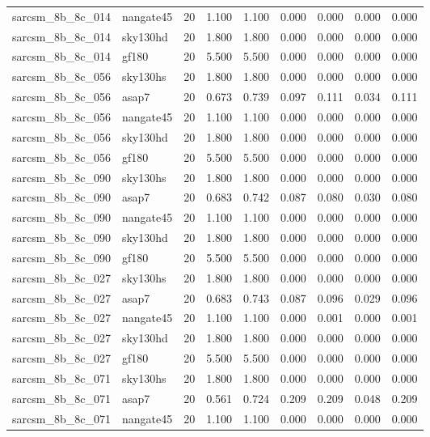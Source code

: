 \begin{tabular}{llrrrrrrr}
sarcsm\_8b\_8c\_014 & nangate45 & 20 & 1.100 & 1.100 & 0.000 & 0.000 & 0.000 & 0.000 \\
sarcsm\_8b\_8c\_014 & sky130hd & 20 & 1.800 & 1.800 & 0.000 & 0.000 & 0.000 & 0.000 \\
sarcsm\_8b\_8c\_014 & gf180 & 20 & 5.500 & 5.500 & 0.000 & 0.000 & 0.000 & 0.000 \\
sarcsm\_8b\_8c\_056 & sky130hs & 20 & 1.800 & 1.800 & 0.000 & 0.000 & 0.000 & 0.000 \\
sarcsm\_8b\_8c\_056 & asap7 & 20 & 0.673 & 0.739 & 0.097 & 0.111 & 0.034 & 0.111 \\
sarcsm\_8b\_8c\_056 & nangate45 & 20 & 1.100 & 1.100 & 0.000 & 0.000 & 0.000 & 0.000 \\
sarcsm\_8b\_8c\_056 & sky130hd & 20 & 1.800 & 1.800 & 0.000 & 0.000 & 0.000 & 0.000 \\
sarcsm\_8b\_8c\_056 & gf180 & 20 & 5.500 & 5.500 & 0.000 & 0.000 & 0.000 & 0.000 \\
sarcsm\_8b\_8c\_090 & sky130hs & 20 & 1.800 & 1.800 & 0.000 & 0.000 & 0.000 & 0.000 \\
sarcsm\_8b\_8c\_090 & asap7 & 20 & 0.683 & 0.742 & 0.087 & 0.080 & 0.030 & 0.080 \\
sarcsm\_8b\_8c\_090 & nangate45 & 20 & 1.100 & 1.100 & 0.000 & 0.000 & 0.000 & 0.000 \\
sarcsm\_8b\_8c\_090 & sky130hd & 20 & 1.800 & 1.800 & 0.000 & 0.000 & 0.000 & 0.000 \\
sarcsm\_8b\_8c\_090 & gf180 & 20 & 5.500 & 5.500 & 0.000 & 0.000 & 0.000 & 0.000 \\
sarcsm\_8b\_8c\_027 & sky130hs & 20 & 1.800 & 1.800 & 0.000 & 0.000 & 0.000 & 0.000 \\
sarcsm\_8b\_8c\_027 & asap7 & 20 & 0.683 & 0.743 & 0.087 & 0.096 & 0.029 & 0.096 \\
sarcsm\_8b\_8c\_027 & nangate45 & 20 & 1.100 & 1.100 & 0.000 & 0.001 & 0.000 & 0.001 \\
sarcsm\_8b\_8c\_027 & sky130hd & 20 & 1.800 & 1.800 & 0.000 & 0.000 & 0.000 & 0.000 \\
sarcsm\_8b\_8c\_027 & gf180 & 20 & 5.500 & 5.500 & 0.000 & 0.000 & 0.000 & 0.000 \\
sarcsm\_8b\_8c\_071 & sky130hs & 20 & 1.800 & 1.800 & 0.000 & 0.000 & 0.000 & 0.000 \\
sarcsm\_8b\_8c\_071 & asap7 & 20 & 0.561 & 0.724 & 0.209 & 0.209 & 0.048 & 0.209 \\
sarcsm\_8b\_8c\_071 & nangate45 & 20 & 1.100 & 1.100 & 0.000 & 0.000 & 0.000 & 0.000 \\

\end{tabular}
